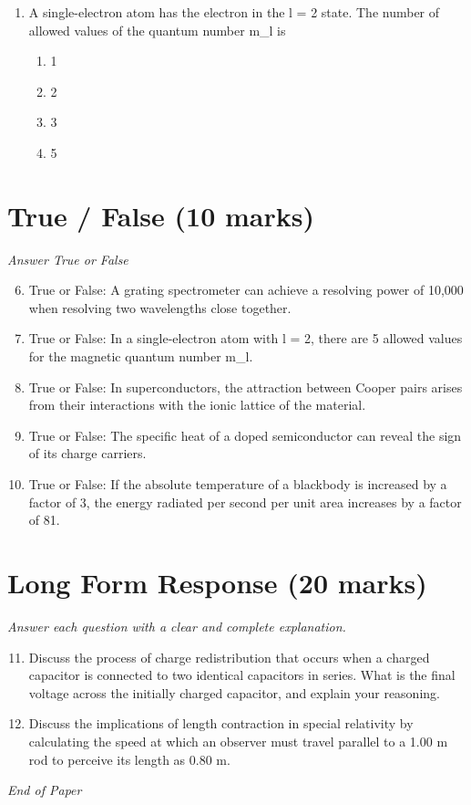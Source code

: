 \documentclass[12pt]{article}
\begin{document}
\begin{enumerate}[label=\arabic*.]
\begin{enumerate}[label=(\alph*)]
    \item n = 3, l = 2
    \item n = 3, l = 1
    \item n = 3, l = 0
    \item n = 2, l = 0
\end{enumerate}
\item A single-electron atom has the electron in the l = 2 state. The number of allowed values of the quantum number m\_l is
\begin{enumerate}[label=(\alph*)]
    \item 1
    \item 2
    \item 3
    \item 5
\end{enumerate}
\end{enumerate}

\section*{True / False (10 marks)}
\textit{Answer True or False}
\begin{enumerate}[label=\arabic*.]
\setcounter{enumi}{5}
\item True or False: A grating spectrometer can achieve a resolving power of 10,000 when resolving two wavelengths close together.
\item True or False: In a single-electron atom with l = 2, there are 5 allowed values for the magnetic quantum number m\_l.
\item True or False: In superconductors, the attraction between Cooper pairs arises from their interactions with the ionic lattice of the material.
\item True or False: The specific heat of a doped semiconductor can reveal the sign of its charge carriers.
\item True or False: If the absolute temperature of a blackbody is increased by a factor of 3, the energy radiated per second per unit area increases by a factor of 81.
\end{enumerate}

\section*{Long Form Response (20 marks)}
\textit{Answer each question with a clear and complete explanation.}
\begin{enumerate}[label=\arabic*.]
\setcounter{enumi}{10}
\item Discuss the process of charge redistribution that occurs when a charged capacitor is connected to two identical capacitors in series. What is the final voltage across the initially charged capacitor, and explain your reasoning.
\item Discuss the implications of length contraction in special relativity by calculating the speed at which an observer must travel parallel to a 1.00 m rod to perceive its length as 0.80 m.
\end{enumerate}

\vfill
\noindent\textit{End of Paper}
\end{document}
